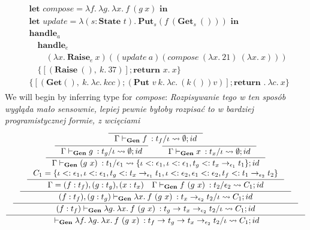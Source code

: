 \documentclass[declaration,shortabstract]{iithesis}
\theoremstyle{definition} \newtheorem{definition}{Definition}[section]
\newcommand{\gens}[6][\Gamma;\Theta]{\ensuremath{{{#1} \vdash_\textbf{Gen} {#2} \: : {#3}/{#4}} \rightsquigarrow {#5};{#6}}}
\newcommand{\arrow}[3]{{#1}\rightarrow_{#2}{#3}}
\newcommand{\lam}[1][x]{\ensuremath{\lambda #1.\:}}
\begin{document}
\begin{gather*}
\begin{aligned}
  & \textbf{let } compose = \lam[f]\lam[g]\lam f\ (g\ x) \textbf{ in}
  \\
  & \textbf{let } update = \lam[(s:\textbf{State }t)] \textbf{Put}_s (f\ (\textbf{Get}_s\ ()))\textbf{ in}
  \\
  & \textbf{handle}_a \\
  & \quad \textbf{handle}_e \\
  & \qquad (\lam \textbf{Raise}_e\ x) ((update\ a) (compose\  (\lam 21)\ (\lam x))) \\
  & \quad \{[(\textbf{Raise}\ (),\  k.\ 37)] ; \textbf{return }x.\ x\} \\
  & \{[(\textbf{Get} (),\  k.\ \lam[c] k c c) ; (\textbf{Put }v\ k.\ \lam[c] (k ()) v) ] ; \textbf{return }.\ \lam[c] x\}
\end{aligned}
\end{gather*}
We will begin by inferring type for \textit{compose}:
\textit{
Rozpisywanie tego w ten sposób wygląda mało sensownie,
lepiej pewnie byłoby rozpisać to w bardziej programistycznej formie, z wcięciami}
$$
\inference{
 \inference{
  \inference{
     \inference{
          \inference{}{\gens[\Gamma]{f}{t_f}{\iota}{\emptyset}{id}}
       \\
     \inference
      {
         \inference{}{\gens[\Gamma]{g}{t_g}{\iota}{\emptyset}{id}}
         &
         \inference{}{\gens[\Gamma]{x}{t_x}{\iota}{\emptyset}{id}} 
      }{
         \gens[\Gamma]{(g\ x)}{t_1}{\epsilon_1}{\{\iota <: \epsilon_1, \iota <: \epsilon_1, t_g <: \arrow{t_x}{\epsilon_1}{t_1}\}}{id}
      } \\
      C_1 = \{
            \iota <: \epsilon_1, \iota <: \epsilon_1, t_g <: \arrow{t_x}{\epsilon_1}{t_1}, 
            \iota <: \epsilon_2, \epsilon_1 <: \epsilon_2, t_f <: \arrow{t_1}{\epsilon_2}{t_2}
        \}
     }{
     \Gamma = (f:t_f),(g:t_g),(x:t_x)
     \quad 
     \gens[\Gamma]{f\ (g\ x)}{t_2}{\epsilon_2}{C_1}{id}
    }
   }{
    \gens[(f:t_f),(g:t_g)]{\lam f\ (g\ x)}{\arrow{t_x}{\epsilon_2}{t_2}}{\iota}{C_1}{id}
   }
  }{
  \gens[(f:t_f)]{\lam[g]\lam f\ (g\ x)}{\arrow{t_g}{}{\arrow{t_x}{\epsilon_2}{t_2}}}{\iota}{C_1}{id}
  }
}{
\gens[]{\lam[f]\lam[g]\lam f\ (g\ x)}{\arrow{t_f}{}{\arrow{t_g}{}{\arrow{t_x}{\epsilon_2}{t_2}}}}{\iota}{C_1}{id}
}
$$
\end{document}
